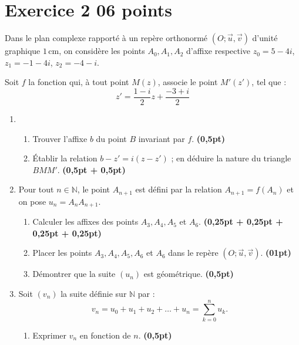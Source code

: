 \documentclass[12pt]{article}
\begin{document}
\section*{Exercice 2 \hfill 06 points}

Dans le plan complexe rapporté à un repère orthonormé \( (O ; \vec{u}, \vec{v}) \) d’unité graphique \( 1\,\text{cm} \), on considère les points \( A_0, A_1, A_2 \) d’affixe respective \( z_0 = 5 - 4i \), \( z_1 = -1 - 4i \), \( z_2 = -4 - i \).

Soit \( f \) la fonction qui, à tout point \( M(z) \), associe le point \( M'(z') \), tel que :
\[
z' = \frac{1 - i}{2} z + \frac{-3 + i}{2}
\]

\begin{enumerate}
    \item 
    \begin{enumerate}
        \item Trouver l’affixe \( b \) du point \( B \) invariant par \( f \). \hfill \textbf{(0,5pt)}
        
        \item Établir la relation \( b - z' = i(z - z') \) ; en déduire la nature du triangle \( BMM' \). \hfill \textbf{(0,5pt + 0,5pt)}
    \end{enumerate}

    \item Pour tout \( n \in \mathbb{N} \), le point \( A_{n+1} \) est défini par la relation \( A_{n+1} = f(A_n) \) et on pose \( u_n = A_n A_{n+1} \).
    \begin{enumerate}
        \item Calculer les affixes des points \( A_3, A_4, A_5 \) et \( A_6 \). \hfill \textbf{(0,25pt + 0,25pt + 0,25pt + 0,25pt)}
        
        \item Placer les points \( A_3, A_4, A_5, A_6 \) et \( A_6 \) dans le repère \( (O ; \vec{u}, \vec{v}) \). \hfill \textbf{(01pt)}
        
        \item Démontrer que la suite \( (u_n) \) est géométrique. \hfill \textbf{(0,5pt)}
    \end{enumerate}
    
    \item Soit \( (v_n) \) la suite définie sur \( \mathbb{N} \) par :
    \[
    v_n = u_0 + u_1 + u_2 + \dots + u_n = \sum_{k=0}^{n} u_k.
    \]
    \begin{enumerate}
        \item Exprimer \( v_n \) en fonction de \( n \). \hfill \textbf{(0,5pt)}
        

\end{enumerate}
\end{enumerate}
\end{document}
